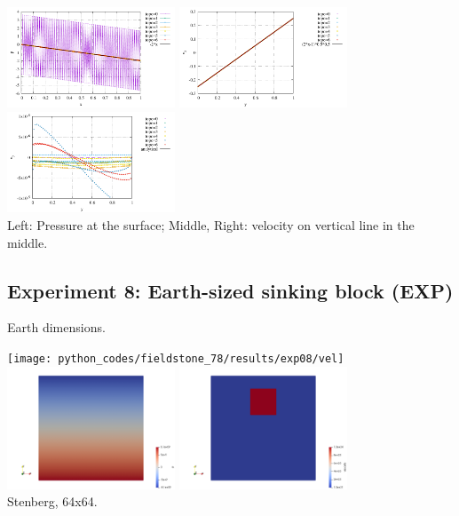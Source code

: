 \begin{center}
\includegraphics[width=5cm]{python_codes/fieldstone_78/results/pressure_top_exp7.pdf}
\includegraphics[width=5cm]{python_codes/fieldstone_78/results/vx_profile_exp7.pdf}
\includegraphics[width=5cm]{python_codes/fieldstone_78/results/vy_profile_exp7.pdf}\\
{\captionfont Left: Pressure at the surface; Middle, Right: velocity on vertical line in the middle.}
\end{center}




\newpage
\subsection*{Experiment 8: Earth-sized sinking block (EXP)}

Earth dimensions. 

\begin{center}
\texttt{[image: python\_codes/fieldstone\_78/results/exp08/vel]}
\includegraphics[width=5cm]{python_codes/fieldstone_78/results/exp08/p}
\includegraphics[width=5cm]{python_codes/fieldstone_78/results/exp08/eta}\\
{\captionfont Stenberg, 64x64.}
\end{center}




